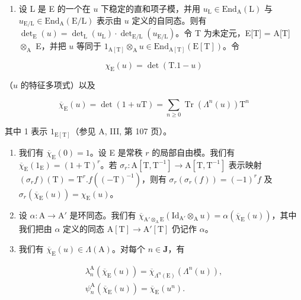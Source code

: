\begin{enumerate}
\def\labelenumi{\alph{enumi})}
\setcounter{enumi}{1}
\tightlist
\item
  设 L 是 E 的一个在 \(u\) 下稳定的直和项子模，并用 \(u_{\mathrm{L}} \in \mathrm{End}_{\mathrm{A}}(\mathrm{L})\) 与 \(u_{\mathrm{E/L}} \in \mathrm{End}_{\mathrm{A}}(\mathrm{E/L})\) 表示由 \(u\) 定义的自同态。则有 \(\det_{\mathrm{E}}(u) = \det_{\mathrm{L}}(u_{\mathrm{L}}) \cdot \det_{\mathrm{E/L}}(u_{\mathrm{E/L}})\)。令 T 为未定元，E{[}T{]} = A{[}T{]} \(\otimes_{\mathrm{A}}\) E，并把 \(u\) 等同于 \(1_{\mathrm{A[T]}} \otimes_{\mathrm{A}} u \in \mathrm{End}_{\mathrm{A[T]}}(\mathrm{E[T]})\)。令
\end{enumerate}

\[
\chi_ {\mathrm{E}} (u) = \det (\mathrm{T}. 1 - u)
\]

（\(u\) 的特征多项式）以及

\[
\overline {{{{\chi}}}} _ {\mathrm{E}} (u) = \det (1 + u \mathrm{T}) = \sum_ {n \geqslant 0} \operatorname{Tr} \left(\Lambda ^ {n} (u)\right) \mathrm{T} ^ {n}
\]

其中 1 表示 \(1_{\mathrm{E[T]}}\)（参见 A, III, 第 107 页）。

\begin{enumerate}
\def\labelenumi{\alph{enumi})}
\setcounter{enumi}{2}
\item
  我们有 \(\overline{\chi}_{\mathrm{E}}(0) = 1\)。设 E 是常秩 \(r\) 的局部自由模。我们有 \(\overline{\chi}_{\mathrm{E}}(1_{\mathrm{E}}) = (1 + \mathrm{T})^{r}\)。若 \(\sigma_r: \mathrm{A}[\mathrm{T}, \mathrm{T}^{-1}] \to \mathrm{A}[\mathrm{T}, \mathrm{T}^{-1}]\) 表示映射 \((\sigma_r f)(\mathrm{T}) = \mathrm{T}^r. f((- \mathrm{T})^{-1})\)，则有 \(\sigma_r(\sigma_r(f)) = (-1)^r f\) 及 \(\sigma_r(\overline{\chi}_{\mathrm{E}}(u)) = \chi_{\mathrm{E}}(u)\)。
\item
  设 \(\alpha: \mathrm{A} \to \mathrm{A}'\) 是环同态。我们有 \(\overline{\chi}_{\mathrm{A}'\otimes_{\mathrm{A}}\mathrm{E}}(\mathrm{Id}_{\mathrm{A}'} \otimes_{\mathrm{A}} u) = \alpha(\overline{\chi}_{\mathrm{E}}(u))\)，其中我们把由 \(\alpha\) 定义的同态 \(\mathrm{A}[\mathrm{T}] \to \mathrm{A}'[\mathrm{T}]\) 仍记作 \(\alpha\)。
\item
  我们有 \(\overline{\chi}_{\mathrm{E}}(u) \in \Lambda(\mathrm{A})\)。对每个 \(n \in \mathbf{J}\)，有
\end{enumerate}

\[
\begin{array}{l} \lambda_ {n} ^ {\mathrm{A}} (\overline {{\chi}} _ {\mathrm{E}} (u)) = \overline {{\chi}} _ {\Lambda^ {n} (\mathrm{E})} (\Lambda^ {n} (u)), \\ \psi_ {n} ^ {\mathrm{A}} (\overline {{\chi}} _ {\mathrm{E}} (u)) = \overline {{\chi}} _ {\mathrm{E}} (u ^ {n}). \end{array}
\]

